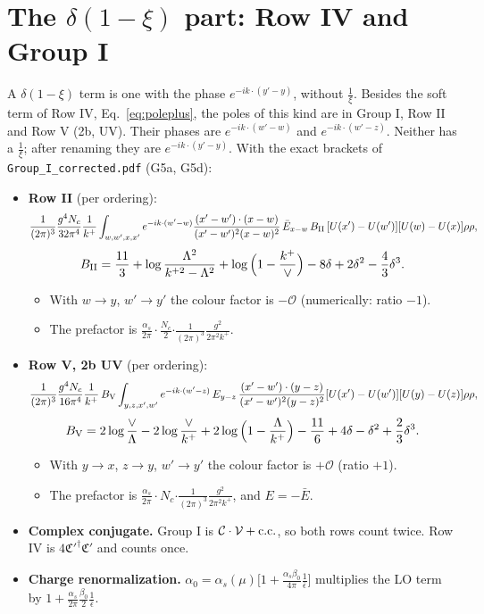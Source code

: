 \documentclass[10pt]{article}
\numberwithin{equation}{section}
\newcommand{\OO}{\mathcal O}
\newcommand{\pre}{\frac{1}{(2\pi)^3}\frac{g^2}{2\pi^2k^+}}
\begin{document}
\section{The \texorpdfstring{$\delta(1-\xi)$}{delta(1-xi)} part: Row IV and Group I}\label{sec:delta}
A $\delta(1-\xi)$ term is one with the phase $e^{-ik\cdot(y'-y)}$, without $\frac1\xi$. Besides the soft term of Row IV, Eq.~\eqref{eq:poleplus}, the poles of this kind are in Group I, Row II and Row V (2b, UV). Their phases are $e^{-ik\cdot(w'-w)}$ and $e^{-ik\cdot(w'-z)}$. Neither has a $\frac1\xi$; after renaming they are $e^{-ik\cdot(y'-y)}$. With the exact brackets of \texttt{Group\_I\_corrected.pdf} (G5a, G5d):
\begin{itemize}
\item \textbf{Row II} (per ordering):
\begin{equation*}
\frac{1}{(2\pi)^3}\frac{g^4N_c}{32\pi^4}\frac1{k^+}\int_{w,w',x,x'}e^{-ik\cdot(w'-w)}\frac{(x'-w')\cdot(x-w)}{(x'-w')^2(x-w)^2}\,\bar E_{x-w}\,B_{\rm II}\,[U(x')-U(w')][U(w)-U(x)]\rho\rho,
\end{equation*}
\begin{equation*}
B_{\rm II}=\frac{11}{3}+\log\frac{\Lambda^2}{k^{+2}-\Lambda^2}+\log\Big(1-\frac{k^+}{\vee}\Big)-8\delta+2\delta^2-\frac43\delta^3 .
\end{equation*}
\begin{itemize}
\item With $w\to y$, $w'\to y'$ the colour factor is $-\OO$ (numerically: ratio $-1$).
\item The prefactor is $\frac{\alpha_s}{2\pi}\cdot$$\frac{N_c}{2}$$\cdot\pre$.
\end{itemize}
\item \textbf{Row V, 2b UV} (per ordering):
\begin{equation*}
\frac{1}{(2\pi)^3}\frac{g^4N_c}{16\pi^4}\frac1{k^+}\,B_{\rm V}\int_{y,z,x',w'}e^{-ik\cdot(w'-z)}\,E_{y-z}\,\frac{(x'-w')\cdot(y-z)}{(x'-w')^2(y-z)^2}[U(x')-U(w')][U(y)-U(z)]\rho\rho,
\end{equation*}
\begin{equation*}
B_{\rm V}=2\log\frac{\vee}{\Lambda}-2\log\frac{\vee}{k^+}+2\log\Big(1-\frac{\Lambda}{k^+}\Big)-\frac{11}{6}+4\delta-\delta^2+\frac23\delta^3 .
\end{equation*}
\begin{itemize}
\item With $y\to x$, $z\to y$, $w'\to y'$ the colour factor is $+\OO$ (ratio $+1$).
\item The prefactor is $\frac{\alpha_s}{2\pi}\cdot$$N_c$$\cdot\pre$, and $E=-\bar E$.
\end{itemize}
\item \textbf{Complex conjugate.} Group I is $\mathcal C\cdot\mathcal V+{\rm c.c.}$, so both rows count twice. Row IV is $4\mathfrak C'^\dagger\mathfrak C'$ and counts once.
\item \textbf{Charge renormalization.} $\alpha_0=\alpha_s(\mu)\big[1+\frac{\alpha_s\beta_0}{4\pi}\frac1{\bar\epsilon}\big]$ multiplies the LO term by $1+\frac{\alpha_s}{2\pi}\frac{\beta_0}{2}\frac1{\bar\epsilon}$.
\end{itemize}
\end{document}
